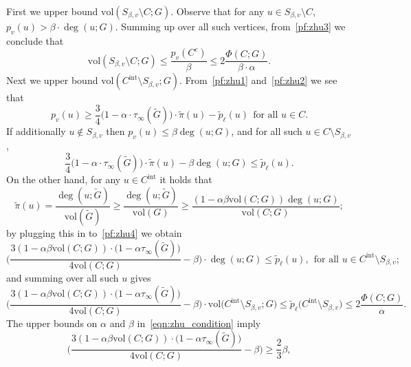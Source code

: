 \documentclass[twoside,11pt]{article}
\newcommand{\1}{\mathbf{1}}
\newcommand{\wt}[1]{\widetilde{#1}}
\newcommand{\vol}{\mathrm{vol}}
\begin{document}
First we upper bound $\vol(S_{\beta,v} \setminus C;G)$. Observe that for any $u \in S_{\beta,v} \setminus C$, $p_v(u) > \beta \cdot \deg(u;G)$. Summing up over all such vertices, from~\eqref{pf:zhu3} we conclude that
\begin{equation}
\label{pf:zhu3.5}
\vol(S_{\beta,v} \setminus C; G) \leq \frac{p_v(C^c)}{\beta} \leq 2\frac{\Phi(C;G)}{\beta \cdot \alpha}.
\end{equation} 
Next we upper bound $\vol(C^{\mathrm{int}} \setminus S_{\beta,v};G)$. From~\eqref{pf:zhu1} and~\eqref{pf:zhu2} we see that 
\begin{equation*}
p_v(u) \geq \frac{3}{4}\bigl(1 - \alpha \cdot \tau_{\infty}(\wt{G})\bigr) \cdot \wt{\pi}(u) - \wt{p}_{\ell}(u)~~\textrm{for all $u \in C$.}
\end{equation*}
If additionally $u \not\in S_{\beta,v}$ then $p_v(u) \leq \beta \deg(u;G)$, and for all such $u \in C \setminus S_{\beta,v}$,
\begin{equation}
\label{pf:zhu4}
\frac{3}{4}\bigl(1 - \alpha \cdot \tau_{\infty}(\wt{G})\bigr) \cdot \wt{\pi}(u) -  \beta\deg(u;G) \leq \wt{p}_{\ell}(u).
\end{equation}
On the other hand, for any $u \in C^{\mathrm{int}}$ it holds that
\begin{equation*}
\wt{\pi}(u) = \frac{\deg(u;\wt{G})}{\vol(\wt{G})} \geq \frac{\deg(u;\wt{G})}{\vol(G)} \geq \frac{(1 - \alpha \beta \vol(C;G))\deg(u;G)}{\vol(C;G)};
\end{equation*}
by plugging this in to~\eqref{pf:zhu4} we obtain
\begin{equation*}
\biggl(\frac{3(1 - \alpha \beta \vol(C;G))\cdot\bigl(1 - \alpha \tau_{\infty}(\wt{G})\bigr)}{4\vol(C;G)} - \beta\biggr) \cdot \deg(u;G) \leq \wt{p}_{\ell}(u),~~\textrm{for all $u \in C^{\mathrm{int}} \setminus S_{\beta,v}$};
\end{equation*}
and summing over all such $u$ gives
\begin{equation*}
\biggl(\frac{3(1 - \alpha \beta \vol(C;G))\cdot\bigl(1 - \alpha \tau_{\infty}(\wt{G})\bigr)}{4\vol(C;G)} - \beta\biggr) \cdot \vol\bigl(C^{\mathrm{int}} \setminus S_{\beta,v}; G\bigr) \leq \wt{p}_{\ell}\bigl(C^{\mathrm{int}} \setminus S_{\beta,v}\bigr) \leq 2\frac{\Phi(C;G)}{\alpha}.
\end{equation*}
The upper bounds on $\alpha$ and $\beta$ in~\eqref{eqn:zhu_condition} imply
\begin{equation*}
\biggl(\frac{3(1 - \alpha \beta \vol(C;G))\cdot\bigl(1 - \alpha \tau_{\infty}(\wt{G})\bigr)}{4\vol(C;G)} - \beta\biggr) \geq \frac{2}{3}\beta,
\end{equation*}
\end{document}
